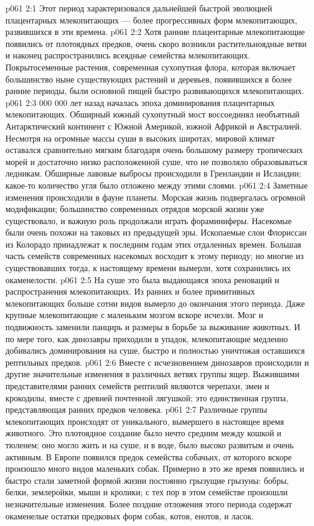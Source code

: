 \vs p061 2:1 Этот период характеризовался дальнейшей быстрой эволюцией плацентарных млекопитающих --- более прогрессивных форм млекопитающих, развившихся в эти времена.
\vs p061 2:2 Хотя ранние плацентарные млекопитающие появились от плотоядных предков, очень скоро возникли растительноядные ветви и наконец распространились всеядные семейства млекопитающих. Покрытосеменные растения, современная сухопутная флора, которая включает большинство ныне существующих растений и деревьев, появившихся в более ранние периоды, были основной пищей быстро развивающихся млекопитающих.
\vs p061 2:3  000 000 лет назад началась эпоха доминирования плацентарных млекопитающих. Обширный южный сухопутный мост воссоединял необъятный Антарктический континент с Южной Америкой, южной Африкой и Австралией. Несмотря на огромные массы суши в высоких широтах, мировой климат оставался сравнительно мягким благодаря очень большому размеру тропических морей и достаточно низко расположенной суше, что не позволяло образовываться ледникам. Обширные лавовые выбросы происходили в Гренландии и Исландии; какое\hyp{}то количество угля было отложено между этими слоями.
\vs p061 2:4 Заметные изменения происходили в фауне планеты. Морская жизнь подвергалась огромной модификации; большинство современных отрядов морской жизни уже существовало, и важную роль продолжали играть фораминиферы. Насекомые были очень похожи на таковых из предыдущей эры. Ископаемые слои Флориссан из Колорадо принадлежат к последним годам этих отдаленных времен. Большая часть семейств современных насекомых восходит к этому периоду; но многие из существовавших тогда, к настоящему времени вымерли, хотя сохранились их окаменелости.
\vs p061 2:5 На суше это была выдающаяся эпоха реноваций и распространения млекопитающих. Из ранних и более примитивных млекопитающих больше сотни видов вымерло до окончания этого периода. Даже крупные млекопитающие с маленьким мозгом вскоре исчезли. Мозг и подвижность заменили панцирь и размеры в борьбе за выживание животных. И по мере того, как динозавры приходили в упадок, млекопитающие медленно добивались доминирования на суше, быстро и полностью уничтожая оставшихся рептильных предков.
\vs p061 2:6 Вместе с исчезновением динозавров происходили и другие значительные изменения в различных ветвях группы ящер. Выжившими представителями ранних семейств рептилий являются черепахи, змеи и крокодилы, вместе с древней почтенной лягушкой; это единственная группа, представляющая ранних предков человека.
\vs p061 2:7 Различные группы млекопитающих происходят от уникального, вымершего в настоящее время животного. Это плотоядное создание было нечто средним между кошкой и тюленем; оно могло жить и на суше, и в воде, было высоко развитым и очень активным. В Европе появился предок семейства собачьих, от которого вскоре произошло много видов маленьких собак. Примерно в это же время появились и быстро стали заметной формой жизни постоянно грызущие грызуны: бобры, белки, землеройки, мыши и кролики; с тех пор в этом семействе произошли незначительные изменения. Более поздние отложения этого периода содержат окаменелые остатки предковых форм собак, котов, енотов, и ласок.

